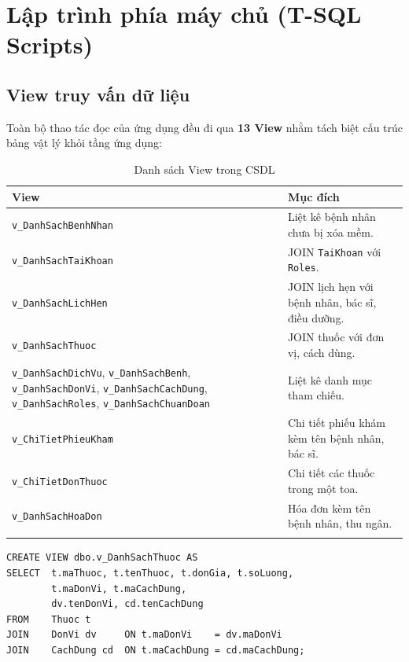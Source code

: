 \documentclass[12pt,a4paper]{report}
\begin{document}
\section{Lập trình phía máy chủ (T-SQL Scripts)}

\subsection{View truy vấn dữ liệu}

Toàn bộ thao tác đọc của ứng dụng đều đi qua \textbf{13 View} nhằm tách biệt cấu trúc bảng vật lý khỏi tầng ứng dụng:

\begin{longtable}{|l|p{8.5cm}|}
\hline
\textbf{View} & \textbf{Mục đích} \\\hline\endhead
\texttt{v\_DanhSachBenhNhan} & Liệt kê bệnh nhân chưa bị xóa mềm. \\\hline
\texttt{v\_DanhSachTaiKhoan} & JOIN \texttt{TaiKhoan} với \texttt{Roles}. \\\hline
\texttt{v\_DanhSachLichHen} & JOIN lịch hẹn với bệnh nhân, bác sĩ, điều dưỡng. \\\hline
\texttt{v\_DanhSachThuoc} & JOIN thuốc với đơn vị, cách dùng. \\\hline
\texttt{v\_DanhSachDichVu}, \texttt{v\_DanhSachBenh}, \texttt{v\_DanhSachDonVi}, \texttt{v\_DanhSachCachDung}, \texttt{v\_DanhSachRoles}, \texttt{v\_DanhSachChuanDoan} & Liệt kê danh mục tham chiếu. \\\hline
\texttt{v\_ChiTietPhieuKham} & Chi tiết phiếu khám kèm tên bệnh nhân, bác sĩ. \\\hline
\texttt{v\_ChiTietDonThuoc} & Chi tiết các thuốc trong một toa. \\\hline
\texttt{v\_DanhSachHoaDon} & Hóa đơn kèm tên bệnh nhân, thu ngân. \\\hline
\caption{Danh sách View trong CSDL}
\end{longtable}

\begin{lstlisting}[language=TSQL,caption={View v\_DanhSachThuoc -- chuẩn hóa truy vấn danh mục thuốc}]
CREATE VIEW dbo.v_DanhSachThuoc AS
SELECT  t.maThuoc, t.tenThuoc, t.donGia, t.soLuong,
        t.maDonVi, t.maCachDung,
        dv.tenDonVi, cd.tenCachDung
FROM    Thuoc t
JOIN    DonVi dv     ON t.maDonVi    = dv.maDonVi
JOIN    CachDung cd  ON t.maCachDung = cd.maCachDung;
\end{lstlisting}
\end{document}
